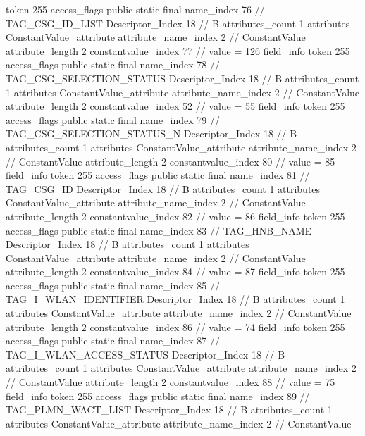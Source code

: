 {{{{{				token	255
				access_flags	public static final
				name_index	76		// TAG_CSG_ID_LIST
				Descriptor_Index	18		// B
				attributes_count	1
				attributes {
				ConstantValue_attribute {
					attribute_name_index	2		// ConstantValue
					attribute_length	2
					constantvalue_index	77		// value = 126
				}
				}
			}
			field_info {
				token	255
				access_flags	public static final
				name_index	78		// TAG_CSG_SELECTION_STATUS
				Descriptor_Index	18		// B
				attributes_count	1
				attributes {
				ConstantValue_attribute {
					attribute_name_index	2		// ConstantValue
					attribute_length	2
					constantvalue_index	52		// value = 55
				}
				}
			}
			field_info {
				token	255
				access_flags	public static final
				name_index	79		// TAG_CSG_SELECTION_STATUS_N
				Descriptor_Index	18		// B
				attributes_count	1
				attributes {
				ConstantValue_attribute {
					attribute_name_index	2		// ConstantValue
					attribute_length	2
					constantvalue_index	80		// value = 85
				}
				}
			}
			field_info {
				token	255
				access_flags	public static final
				name_index	81		// TAG_CSG_ID
				Descriptor_Index	18		// B
				attributes_count	1
				attributes {
				ConstantValue_attribute {
					attribute_name_index	2		// ConstantValue
					attribute_length	2
					constantvalue_index	82		// value = 86
				}
				}
			}
			field_info {
				token	255
				access_flags	public static final
				name_index	83		// TAG_HNB_NAME
				Descriptor_Index	18		// B
				attributes_count	1
				attributes {
				ConstantValue_attribute {
					attribute_name_index	2		// ConstantValue
					attribute_length	2
					constantvalue_index	84		// value = 87
				}
				}
			}
			field_info {
				token	255
				access_flags	public static final
				name_index	85		// TAG_I_WLAN_IDENTIFIER
				Descriptor_Index	18		// B
				attributes_count	1
				attributes {
				ConstantValue_attribute {
					attribute_name_index	2		// ConstantValue
					attribute_length	2
					constantvalue_index	86		// value = 74
				}
				}
			}
			field_info {
				token	255
				access_flags	public static final
				name_index	87		// TAG_I_WLAN_ACCESS_STATUS
				Descriptor_Index	18		// B
				attributes_count	1
				attributes {
				ConstantValue_attribute {
					attribute_name_index	2		// ConstantValue
					attribute_length	2
					constantvalue_index	88		// value = 75
				}
				}
			}
			field_info {
				token	255
				access_flags	public static final
				name_index	89		// TAG_PLMN_WACT_LIST
				Descriptor_Index	18		// B
				attributes_count	1
				attributes {
				ConstantValue_attribute {
					attribute_name_index	2		// ConstantValue
}}}}}}}
